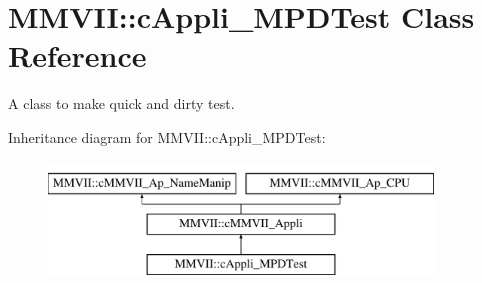\hypertarget{classMMVII_1_1cAppli__MPDTest}{}\section{M\+M\+V\+II\+:\+:c\+Appli\+\_\+\+M\+P\+D\+Test Class Reference}
\label{classMMVII_1_1cAppli__MPDTest}


A class to make quick and dirty test.  


Inheritance diagram for M\+M\+V\+II\+:\+:c\+Appli\+\_\+\+M\+P\+D\+Test\+:\begin{figure}[H]
\begin{center}
\leavevmode
\includegraphics[height=3.000000cm]{classMMVII_1_1cAppli__MPDTest}
\end{center}
\end{figure}

